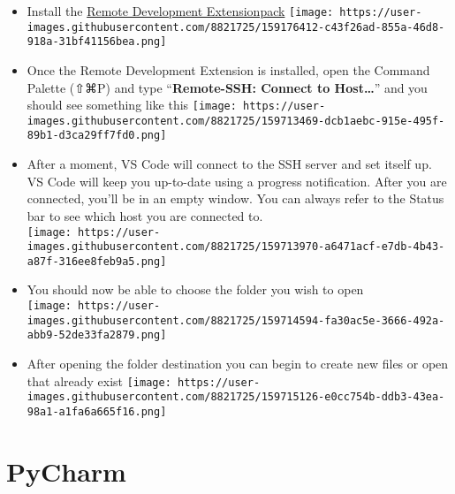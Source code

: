 \documentclass[
  letterpaper,
  DIV=11,
  numbers=noendperiod]{scrreprt}
\begin{document}
\begin{itemize}
\item
  Install the
  \href{https://marketplace.visualstudio.com/items?itemName=ms-vscode-remote.vscode-remote-extensionpack}{Remote
  Development Extensionpack}
  \texttt{[image: https://user-images.githubusercontent.com/8821725/159176412-c43f26ad-855a-46d8-918a-31bf41156bea.png]}
\item
  Once the Remote Development Extension is installed, open the Command
  Palette (⇧⌘P) and type ``\textbf{Remote-SSH: Connect to
  Host\ldots{}}'' and you should see something like this
  \texttt{[image: https://user-images.githubusercontent.com/8821725/159713469-dcb1aebc-915e-495f-89b1-d3ca29ff7fd0.png]}
\item
  After a moment, VS Code will connect to the SSH server and set itself
  up. VS Code will keep you up-to-date using a progress notification.
  After you are connected, you'll be in an empty window. You can always
  refer to the Status bar to see which host you are connected to.\\
  \texttt{[image: https://user-images.githubusercontent.com/8821725/159713970-a6471acf-e7db-4b43-a87f-316ee8feb9a5.png]}
\item
  You should now be able to choose the folder you wish to open\\
  \texttt{[image: https://user-images.githubusercontent.com/8821725/159714594-fa30ac5e-3666-492a-abb9-52de33fa2879.png]}
\item
  After opening the folder destination you can begin to create new files
  or open that already exist
  \texttt{[image: https://user-images.githubusercontent.com/8821725/159715126-e0cc754b-ddb3-43ea-98a1-a1fa6a665f16.png]}
\end{itemize}

\hypertarget{pycharm}{%
\section*{\texorpdfstring{\textbf{PyCharm}}{PyCharm}}\label{pycharm}}
\end{document}
